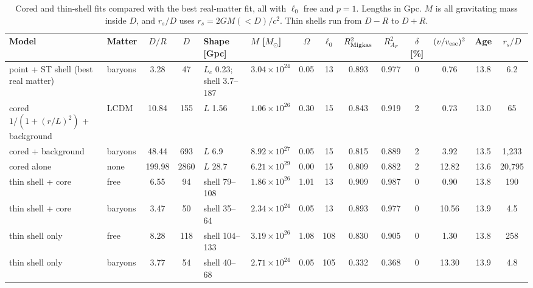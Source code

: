 \documentclass[10pt,letterpaper]{article}
\begin{document}
\begin{table}[H]\centering\scriptsize\setlength{\tabcolsep}{1.6pt}
\caption{Cored and thin-shell fits compared with the best real-matter fit, all with $\ell_0$ free and $p=1$. Lengths in Gpc. $M$ is all gravitating mass inside $D$, and $r_s/D$ uses $r_s=2GM(<D)/c^2$. Thin shells run from $D-R$ to $D+R$.}\label{tab:alt}
\begin{tabular}{llccllcccccccc}\toprule
Model & Matter & $D/R$ & $D$ & Shape [Gpc] & $M$ [$M_\odot$] & $\Omega$ & $\ell_0$ & $R^2_{\rm Migkas}$ & $R^2_{A_F}$ & $\delta$ [\%] & $(v/v_{\rm esc})^2$ & Age & $r_s/D$\\\midrule
point + ST shell (best real matter) & baryons & 3.28 & 47 & $L_c$ 0.23; shell 3.7--187 & $3.04\times10^{24}$ & 0.05 & 13 & 0.893 & 0.977 & 0 & 0.76 & 13.8 & 6.2\\
cored $1/(1+(r/L)^2)$ + background & LCDM & 10.84 & 155 & $L$ 1.56 & $1.06\times10^{26}$ & 0.30 & 15 & 0.843 & 0.919 & 2 & 0.73 & 13.0 & 65\\
cored + background & baryons & 48.44 & 693 & $L$ 6.9 & $8.92\times10^{27}$ & 0.05 & 15 & 0.815 & 0.889 & 2 & 3.92 & 13.5 & 1{,}233\\
cored alone & none & 199.98 & 2860 & $L$ 28.7 & $6.21\times10^{29}$ & 0.00 & 15 & 0.809 & 0.882 & 2 & 12.82 & 13.6 & 20{,}795\\
thin shell + core & free & 6.55 & 94 & shell 79--108 & $1.86\times10^{26}$ & 1.01 & 13 & 0.909 & 0.987 & 0 & 0.90 & 13.8 & 190\\
thin shell + core & baryons & 3.47 & 50 & shell 35--64 & $2.34\times10^{24}$ & 0.05 & 13 & 0.893 & 0.977 & 0 & 10.56 & 13.9 & 4.5\\
thin shell only & free & 8.28 & 118 & shell 104--133 & $3.19\times10^{26}$ & 1.08 & 108 & 0.830 & 0.905 & 0 & 1.30 & 13.8 & 258\\
thin shell only & baryons & 3.77 & 54 & shell 40--68 & $2.71\times10^{24}$ & 0.05 & 105 & 0.332 & 0.368 & 0 & 13.30 & 13.9 & 4.8\\
\bottomrule\end{tabular}\end{table}
\end{document}
